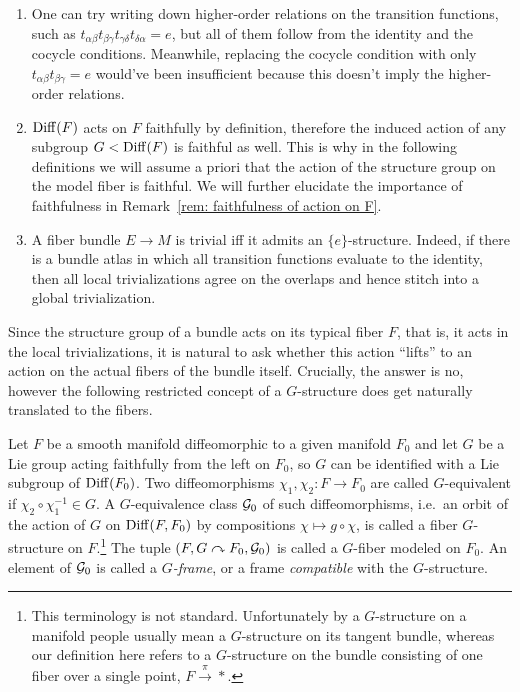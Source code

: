 \begin{rem}\label{rem: faithful action on F 0}
    \begin{enumerate}
        \item One can try writing down higher-order relations on the transition functions, such as $t_{\alpha\beta}t_{\beta\gamma}t_{\gamma\delta}t_{\delta\alpha}=e$, but all of them follow from the identity and the cocycle conditions. Meanwhile, replacing the cocycle condition with only $t_{\alpha\beta}t_{\beta\gamma}=e$ would've been insufficient because this doesn't imply the higher-order relations.
        \item $\operatorname{Diff}(F)$ acts on $F$ faithfully by definition, therefore the induced action of any subgroup $G<\operatorname{Diff}(F)$ is faithful as well. This is why in the following definitions we will assume a priori that the action of the structure group on the model fiber is faithful. We will further elucidate the importance of faithfulness in Remark~\ref{rem: faithfulness of action on F}.
        \item A fiber bundle $E\to M$ is trivial iff it admits an $\{e\}$-structure. Indeed, if there is a bundle atlas in which all transition functions evaluate to the identity, then all local trivializations agree on the overlaps and hence stitch into a global trivialization.
    \end{enumerate}
\end{rem}


Since the structure group of a bundle acts on its typical fiber $F$, that is, it acts in the local trivializations, it is natural to ask whether this action ``lifts'' to an action on the actual fibers of the bundle itself. Crucially, the answer is no, however the following restricted concept of a $G$-structure does get naturally translated to the fibers.

\begin{defn}[$G$-fiber]
    Let $F$ be a smooth manifold diffeomorphic to a given manifold $F_0$ and let $G$ be a Lie group acting faithfully from the left on $F_0$, so $G$ can be identified with a Lie subgroup of $\operatorname{Diff}(F_0)$. Two diffeomorphisms $\chi_1,\chi_2:F\to F_0$ are called $G$-equivalent if $\chi_2\circ \chi_1^{-1}\in G$. A $G$-equivalence class $\mathcal{G}_0$ of such diffeomorphisms, i.e.~an orbit of the action of $G$ on $\operatorname{Diff}(F,F_0)$ by compositions $\chi\mapsto g\circ \chi$, is called a fiber $G$-structure on $F$.\footnote{This terminology is not standard. Unfortunately by a $G$-structure on a manifold people usually mean a $G$-structure on its tangent bundle, whereas our definition here refers to a $G$-structure on the bundle consisting of one fiber over a single point, $F\overset{\pi}{\to}\ast$.} The tuple $(F,G\curvearrowright F_0,\mathcal{G}_0)$ is called a $G$-fiber modeled on $F_0$. An element of $\mathcal{G}_0$ is called a \emph{$G$-frame}, or a frame \emph{compatible} with the $G$-structure.
\end{defn}


